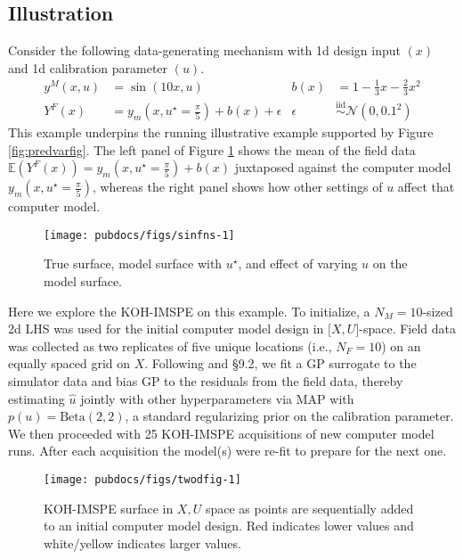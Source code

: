 \documentclass[
]{article}
\begin{document}
\hypertarget{illustration}{%
\subsection{Illustration}\label{illustration}}

Consider the following data-generating mechanism with 1d design input \((x)\)
and 1d calibration parameter \((u)\).
\begin{align*}
y^M(x,u) &= \sin (10x, u) &
b(x) &= 1-\frac{1}{3}x - \frac{2}{3}x^2 \\
Y^F(x) &= y_m\left(x, u^\star = \frac{\pi}{5}\right) + b(x) + \epsilon 
& \epsilon &\stackrel{\mathrm{iid}}{\sim} \mathcal N(0, 0.1^2)
\end{align*}
This example underpins the running illustrative example supported by
Figure \ref{fig:predvarfig}. The left panel of
Figure \ref{fig:sinfns} shows the mean of the field data \(\mathbb{E}(Y^F(x)) = y_m\left(x, u^\star = \frac{\pi}{5}\right) + b(x)\) juxtaposed against
the computer model \(y_m\left(x, u^\star = \frac{\pi}{5}\right)\), whereas
the right panel shows how other settings of \(u\) affect that computer model.

\begin{figure}[ht!]
\texttt{[image: pubdocs/figs/sinfns-1]} \caption{True surface, model surface with $u^\star$, and effect of varying $u$ on the model surface.}\label{fig:sinfns}
\end{figure}

Here we explore the KOH-IMSPE on this example. To initialize, a \(N_M = 10\)-sized 2d LHS was used for the initial computer model design in
\(\lbrack X, U\rbrack\)-space. Field data was collected as two replicates
of five unique locations (i.e., \(N_F = 10\)) on an equally spaced grid on \(X\). Following \citet{bayarri2009modularization} and \citet{gramacy2020surrogates} \S9.2, we fit a
GP surrogate to the simulator data and bias GP to the residuals from the field data, thereby estimating \(\hat{u}\) jointly with other hyperparameters
via MAP with \(p(u) = \mathrm{Beta}(2,2)\), a standard regularizing prior on
the calibration parameter. We then proceeded with
25 KOH-IMSPE acquisitions of new computer model
runs. After each acquisition the model(s) were re-fit to prepare for the
next one.

\begin{figure}[ht!]

{\centering \texttt{[image: pubdocs/figs/twodfig-1]} 

}

\caption{KOH-IMSPE surface in $X, U$ space as points are sequentially added to an initial computer model design.  Red indicates lower values and white/yellow indicates larger values.}\label{fig:twodfig}
\end{figure}
\end{document}
